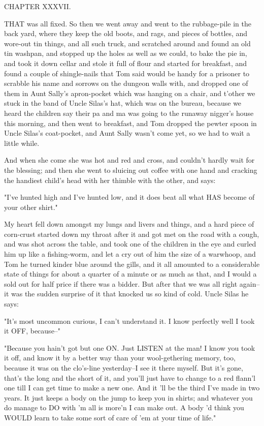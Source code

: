CHAPTER XXXVII.

THAT was all fixed.  So then we went away and went to the rubbage-pile in
the back yard, where they keep the old boots, and rags, and pieces of
bottles, and wore-out tin things, and all such truck, and scratched
around and found an old tin washpan, and stopped up the holes as well as
we could, to bake the pie in, and took it down cellar and stole it full
of flour and started for breakfast, and found a couple of shingle-nails
that Tom said would be handy for a prisoner to scrabble his name and
sorrows on the dungeon walls with, and dropped one of them in Aunt
Sally's apron-pocket which was hanging on a chair, and t'other we stuck
in the band of Uncle Silas's hat, which was on the bureau, because we
heard the children say their pa and ma was going to the runaway nigger's
house this morning, and then went to breakfast, and Tom dropped the
pewter spoon in Uncle Silas's coat-pocket, and Aunt Sally wasn't come
yet, so we had to wait a little while.

And when she come she was hot and red and cross, and couldn't hardly wait
for the blessing; and then she went to sluicing out coffee with one hand
and cracking the handiest child's head with her thimble with the other,
and says:

"I've hunted high and I've hunted low, and it does beat all what HAS
become of your other shirt."

My heart fell down amongst my lungs and livers and things, and a hard
piece of corn-crust started down my throat after it and got met on the
road with a cough, and was shot across the table, and took one of the
children in the eye and curled him up like a fishing-worm, and let a cry
out of him the size of a warwhoop, and Tom he turned kinder blue around
the gills, and it all amounted to a considerable state of things for
about a quarter of a minute or as much as that, and I would a sold out
for half price if there was a bidder.  But after that we was all right
again--it was the sudden surprise of it that knocked us so kind of cold.
Uncle Silas he says:

"It's most uncommon curious, I can't understand it.  I know perfectly
well I took it OFF, because--"

"Because you hain't got but one ON.  Just LISTEN at the man!  I know you
took it off, and know it by a better way than your wool-gethering memory,
too, because it was on the clo's-line yesterday--I see it there myself.
But it's gone, that's the long and the short of it, and you'll just have
to change to a red flann'l one till I can get time to make a new one.
And it 'll be the third I've made in two years.  It just keeps a body on
the jump to keep you in shirts; and whatever you do manage to DO with 'm
all is more'n I can make out.  A body 'd think you WOULD learn to take
some sort of care of 'em at your time of life."

